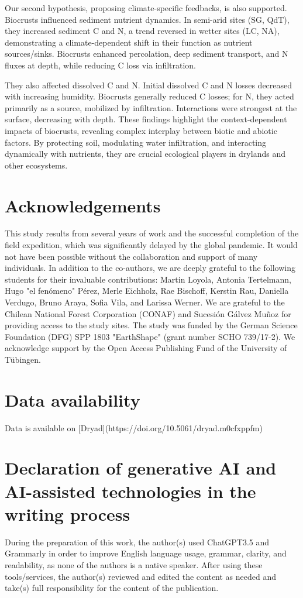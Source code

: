 Our second hypothesis, proposing climate-specific feedbacks, is also supported. Biocrusts influenced sediment nutrient dynamics. In semi-arid sites (SG, QdT), they increased sediment C and N, a trend reversed in wetter sites (LC, NA), demonstrating a climate-dependent shift in their function as nutrient sources/sinks. Biocrusts enhanced percolation, deep sediment transport, and N fluxes at depth, while reducing C loss via infiltration.

They also affected dissolved C and N. Initial dissolved C and N losses decreased with increasing humidity. Biocrusts generally reduced C losses; for N, they acted primarily as a source, mobilized by infiltration. Interactions were strongest at the surface, decreasing with depth.
These findings highlight the context-dependent impacts of biocrusts, revealing complex interplay between biotic and abiotic factors. By protecting soil, modulating water infiltration, and interacting dynamically with nutrients, they are crucial ecological players in drylands and other ecosystems.

\section*{Acknowledgements}

This study results from several years of work and the successful completion of the field expedition, which was significantly delayed by the global pandemic. It would not have been possible without the collaboration and support of many individuals. In addition to the co-authors, we are deeply grateful to the following students for their invaluable contributions: Martin Loyola, Antonia Tertelmann, Hugo "el fenómeno" Pérez, Merle Eichholz, Rae Bischoff, Kerstin Rau, Daniella Verdugo, Bruno Araya, Sofia Vila, and Larissa Werner. We are grateful to the Chilean National Forest Corporation (CONAF) and Sucesión Gálvez Muñoz for providing access to the study sites. The study was funded by the German Science Foundation (DFG) SPP 1803 "EarthShape" (grant number SCHO 739/17-2). We acknowledge support by the Open Access Publishing Fund of the University of Tübingen.

\section*{Data availability}

Data is available on [Dryad](https://doi.org/10.5061/dryad.m0cfxppfm)

\section*{Declaration of generative AI and AI-assisted technologies in the writing process}

During the preparation of this work, the author(s) used ChatGPT3.5 and Grammarly in order to improve English language usage, grammar, clarity, and readability, as none of the authors is a native speaker. After using these tools/services, the author(s) reviewed and edited the content as needed and take(s) full responsibility for the content of the publication.
